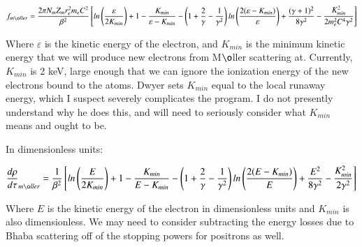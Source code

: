 \documentclass[]{article}
\begin{document}
\begin{equation}
f_{m\o ller}=\frac{2\pi N_m Z_m r_e^2 m_e C^2}{\beta^2}\left[ ln\left( \frac{\varepsilon}{2K_{min}} \right) +1 - \frac{K_{min}}{\varepsilon- K_{min}} - \left(1+\frac{2}{\gamma}-\frac{1}{\gamma^2} \right) ln \left(   \frac{2(\varepsilon-K_{min})}{\varepsilon}\right) + \frac{(\gamma+1)^2}{8\gamma^2} - \frac{K_{min}^2}{2m_e^2C^4\gamma^2}   \right] 
\end{equation}

Where $\varepsilon$ is the kinetic energy of the electron, and $K_{min}$ is the minimum kinetic energy that we will produce new electrons from M$\o$ller scattering at. Currently, $K_{min}$ is 2 keV, large enough that we can ignore the ionization energy of the new electrons bound to the atoms. Dwyer sets $K_{min}$ equal to the local runaway energy, which I suspect severely complicates the program. I do not presently understand why he does this, and will need to seriously consider what $K_{min}$ means and ought to be.

In dimensionless units:

\begin{equation}
\frac{d \rho}{d \tau}_{m\o ller}=\frac{1}{\beta^2}\left[ ln\left( \frac{E}{2K_{min}} \right) +1 - \frac{K_{min}}{E- K_{min}} - \left(1+\frac{2}{\gamma}-\frac{1}{\gamma^2} \right) ln \left(   \frac{2(E-K_{min})}{E}\right) + \frac{E^2}{8\gamma^2} - \frac{K_{min}^2}{2\gamma^2}   \right] 
\end{equation}

Where $E$ is the kinetic energy of the electron in dimensionless units and $K_{min}$ is also dimensionless. We may need to consider subtracting the energy losses due to Bhaba scattering off of the stopping powers for positrons as well.
\end{document}
